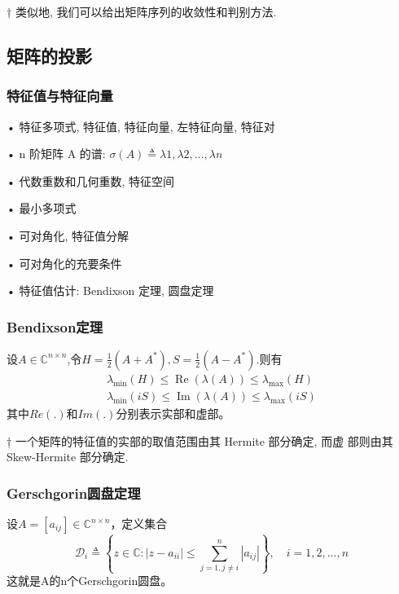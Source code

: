 \documentclass[12pt,a4paper]{article}
\begin{document}
\begin{framed}
    	$†$ 类似地, 我们可以给出矩阵序列的收敛性和判别方法.
\end{framed}

\subsection{矩阵的投影}
\subsubsection{特征值与特征向量}

• 特征多项式, 特征值, 特征向量, 左特征向量, 特征对

• n 阶矩阵 A 的谱: $σ(A) ≜ {λ1, λ2, . . . , λn}$

• 代数重数和几何重数, 特征空间

• 最小多项式

• 可对角化, 特征值分解

• 可对角化的充要条件

• 特征值估计: Bendixson 定理, 圆盘定理

\subsubsection{Bendixson定理}

设$A \in \mathbb{C}^{n \times n}$,令$H=\frac{1}{2}\left(A+A^{*}\right), S=\frac{1}{2}\left(A-A^{*}\right)$.则有
$$
\begin{array}{l}{\lambda_{\min }(H) \leq \operatorname{Re}(\lambda(A)) \leq \lambda_{\max }(H)} \\ {\lambda_{\min }(i S) \leq \operatorname{Im}(\lambda(A)) \leq \lambda_{\max }(i S)}\end{array}
$$
其中$Re(.)$和$Im(.)$分别表示实部和虚部。

\begin{framed}
	† 一个矩阵的特征值的实部的取值范围由其 Hermite 部分确定, 而虚
	部则由其 Skew-Hermite 部分确定.
\end{framed}

\subsubsection{Gerschgorin圆盘定理}
设$A=\left[a_{i j}\right] \in \mathbb{C}^{n \times n}$，定义集合
$$
\mathcal{D}_{i} \triangleq\left\{z \in \mathbb{C} :\left|z-a_{i i}\right| \leq \sum_{j=1, j \neq i}^{n}\left|a_{i j}\right|\right\}, \quad i=1,2, \ldots, n
$$
这就是A的n个Gerschgorin圆盘。
\end{document}
